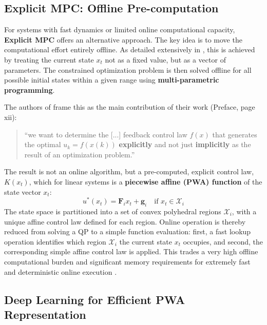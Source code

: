 \subsection{Explicit MPC: Offline Pre-computation}

For systems with fast dynamics or limited online computational capacity, \textbf{Explicit MPC} offers an alternative approach. The key idea is to move the computational effort entirely offline. As detailed extensively in \cite{borrelli2017predictive}, this is achieved by treating the current state $x_t$ not as a fixed value, but as a vector of parameters. The constrained optimization problem is then solved offline for all possible initial states within a given range using \textbf{multi-parametric programming}.

\noindent
The authors of \cite{borrelli2017predictive} frame this as the main contribution of their work (Preface, page xii): 
\begin{quote}
“we want to determine the [...] feedback control law $f(x)$ that generates the optimal $u_k = f(x(k))$ \textbf{explicitly} and not just \textbf{implicitly} as the result of an optimization problem.”
\end{quote}
\noindent
The result is not an online algorithm, but a pre-computed, explicit control law, $K(x_t)$, which for linear systems is a \textbf{piecewise affine (PWA) function} of the state vector $x_t$:
\begin{equation}
u^*(x_t) = \mathbf{F}_i x_t + \mathbf{g}_i \quad \text{if } x_t \in \mathcal{X}_i
\end{equation}
\noindent
The state space is partitioned into a set of convex polyhedral regions $\mathcal{X}_i$, with a unique affine control law defined for each region. Online operation is thereby reduced from solving a QP to a simple function evaluation: first, a fast lookup operation identifies which region $\mathcal{X}_i$ the current state $x_t$ occupies, and second, the corresponding simple affine control law is applied. This trades a very high offline computational burden and significant memory requirements for extremely fast and deterministic online execution \cite{bemporad2013explicit, borrelli2017predictive}.

\subsection{Deep Learning for Efficient PWA Representation}

